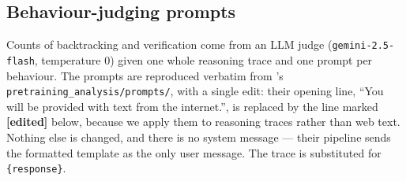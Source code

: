 
\subsection*{Behaviour-judging prompts}

Counts of backtracking and verification come from an LLM judge
(\texttt{gemini-2.5-flash}, temperature 0) given one whole reasoning trace and one
prompt per behaviour. The prompts are reproduced verbatim from
\citet{gandhi2025cognitive}'s \texttt{pretraining\_analysis/prompts/}, with a
single edit: their opening line, ``You will be provided with text from the
internet.'', is replaced by the line marked \textbf{[edited]} below, because we
apply them to reasoning traces rather than web text. Nothing else is changed, and
there is no system message --- their pipeline sends the formatted template as the
only user message. The trace is substituted for \texttt{\{response\}}.

